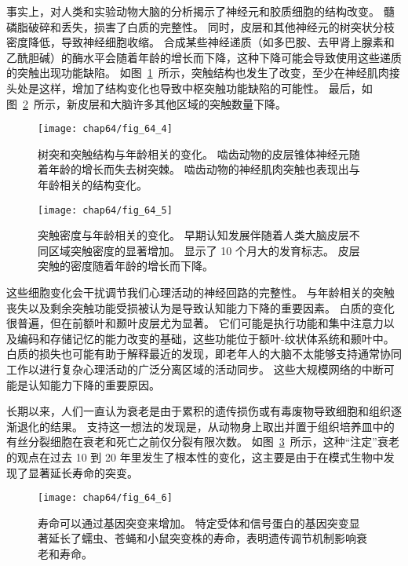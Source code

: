 事实上，对人类和实验动物大脑的分析揭示了神经元和胶质细胞的结构改变。
髓磷脂破碎和丢失，损害了白质的完整性。
同时，皮层和其他神经元的树突状分枝密度降低，导致神经细胞收缩。
合成某些神经递质（如多巴胺、去甲肾上腺素和乙酰胆碱）的酶水平会随着年龄的增长而下降，这种下降可能会导致使用这些递质的突触出现功能缺陷。
如图~\ref{fig:64_4}~所示，突触结构也发生了改变，至少在神经肌肉接头处是这样，增加了结构变化也导致中枢突触功能缺陷的可能性。
最后，如图~\ref{fig:64_5}~所示，新皮层和大脑许多其他区域的突触数量下降。


\begin{figure}[htbp]
	\centering
	\texttt{[image: chap64/fig\_64\_4]}
	\caption{树突和突触结构与年龄相关的变化。
		啮齿动物的皮层锥体神经元随着年龄的增长而失去树突棘。
		啮齿动物的神经肌肉突触也表现出与年龄相关的结构变化。}
	\label{fig:64_4}
\end{figure}


\begin{figure}[htbp]
	\centering
	\texttt{[image: chap64/fig\_64\_5]}
	\caption{突触密度与年龄相关的变化。
		早期认知发展伴随着人类大脑皮层不同区域突触密度的显著增加。
		显示了 10 个月大的发育标志。
		皮层突触的密度随着年龄的增长而下降\cite{huttenlocher2009neural}。}
	\label{fig:64_5}
\end{figure}


这些细胞变化会干扰调节我们心理活动的神经回路的完整性。
与年龄相关的突触丧失以及剩余突触功能受损被认为是导致认知能力下降的重要因素。
白质的变化很普遍，但在前额叶和颞叶皮层尤为显著。
它们可能是执行功能和集中注意力以及编码和存储记忆的能力改变的基础，这些功能位于额叶-纹状体系统和颞叶中。
白质的损失也可能有助于解释最近的发现，即老年人的大脑不太能够支持通常协同工作以进行复杂心理活动的广泛分离区域的活动同步。
这些大规模网络的中断可能是认知能力下降的重要原因。


长期以来，人们一直认为衰老是由于累积的遗传损伤或有毒废物导致细胞和组织逐渐退化的结果。
支持这一想法的发现是，从动物身上取出并置于组织培养皿中的有丝分裂细胞在衰老和死亡之前仅分裂有限次数。
如图~\ref{fig:64_6}~所示，这种“注定”衰老的观点在过去 10 到 20 年里发生了根本性的变化，这主要是由于在模式生物中发现了显著延长寿命的突变。


\begin{figure}[htbp]
	\centering
	\texttt{[image: chap64/fig\_64\_6]}
	\caption{寿命可以通过基因突变来增加。
		特定受体和信号蛋白的基因突变显著延长了蠕虫、苍蝇和小鼠突变株的寿命，表明遗传调节机制影响衰老和寿命\cite{hekimi2003genetics,lin1998extended,brown1996dwarf}。}
	\label{fig:64_6}
\end{figure}


